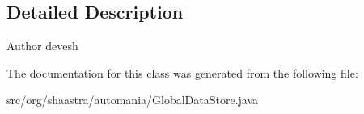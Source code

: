 \subsection{Detailed Description}
\begin{DoxyAuthor}{Author}
devesh 
\end{DoxyAuthor}


The documentation for this class was generated from the following file:\begin{DoxyCompactItemize}
\item 
\-s\-r\-c\-/\-o\-r\-g\-/\-s\-h\-a\-a\-s\-t\-r\-a\-/\-a\-u\-t\-o\-m\-a\-n\-i\-a\-/\-G\-l\-o\-b\-a\-l\-D\-a\-t\-a\-S\-t\-o\-r\-e\-.\-j\-a\-v\-a\end{DoxyCompactItemize}

